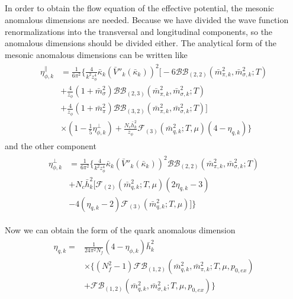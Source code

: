 \documentclass[%
reprint,
superscriptaddress,
showpacs,preprintnumbers,
 amsmath,amssymb,
 aps,
prd,
]{revtex4-1}
\begin{document}
\begin{appendix}
\section{}
In order to obtain the flow equation of the effective potential, the mesonic anomalous dimensions are needed. Because 
we have divided the wave function renormalizations into the transversal and longitudinal components, so the 
anomalous dimensions should be divided either.
The analytical form of the mesonic anomalous dimensions can be written like
\begin{align}
\begin{split}
\eta_{\phi,k}^{\|}
&=\frac{1}{6\pi^2}\bigg\{ 
 \frac{4}{k^2z_\phi^4}\bar{\kappa}_k(\bar{V}''_k(\bar{\kappa}_k))^2\bigg[ 
 -6\mathcal{BB}_{(2,2)}(\bar{m}^{2}_{\pi,k},\bar{m}^{2}_{\sigma,k};T)\\
&+\frac{4}{z_\phi}(1+\bar{m}^{2}_{\sigma}){\mathcal{BB}}_{(2,3)}(\bar{m}^{2}_{\pi,k},\bar{m}^{2}_{\sigma,k};T)\\
&+\frac{4}{z_\phi}(1+\bar{m}^{2}_{\pi}){\mathcal{BB}}_{(3,2)}(\bar{m}^{2}_{\pi,k},\bar{m}^{2}_{\sigma,k};T)\bigg]\\
&\times(1-\frac{1}{5}\eta^{\bot}_{\phi,k})+\frac{N_c\bar{h}^{2}_{k}}{z_\phi}\mathcal{F}_{(3)}(\bar{m}^{2}_{q,k};T,\mu)(4-\eta_{q,k})\bigg\}   
\end{split}
\end{align} 
and the other component
\begin{align}
\begin{split}
\eta_{\phi,k}^{\bot}
&=\frac{1}{6\pi^2}\bigg\{ 
\frac{4}{k^2z_\phi^4}\bar{\kappa}_k(\bar{V}''_k(\bar{\kappa}_k))^2 \mathcal{BB}_{(2,2)}(\bar{m}^{2}_{\pi,k},\bar{m}^{2}_{\sigma,k};T)
\\&+N_c\bar{h}^{2}_{k}\bigg[\mathcal{F}_{(2)}(\bar{m}^{2}_{q,k};T,\mu)(2\eta_{q,k}-3)\\
&-4(\eta_{q,k}-2)\mathcal{F}_{(3)}(\bar{m}^2_{q,k};T,\mu)\bigg]
\bigg\}   
\end{split}
\end{align} 



Now we can obtain the form of the quark anomalous dimension
\begin{align}
\begin{split}
\eta_{q,k}=&\frac{1}{24\pi^2N_f}(4-\eta_{\phi,k})\bar{h}^{2}_{k}\\
&\times\bigg\{ (N^{2}_{f}-1)\mathcal{FB}_{(1,2)}(\bar{m}^{2}_{q,k},\bar{m}^{2}_{\pi,k};T,\mu,p_{0,ex})\\
&+\mathcal{FB}_{(1,2)}(\bar{m}^{2}_{q,k},\bar{m}^{2}_{\sigma,k};T,\mu,p_{0,ex}) \bigg\}
\end{split}
\end{align} 

\end{appendix}
\end{document}
